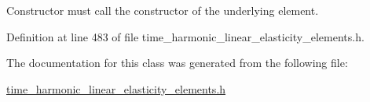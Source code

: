 Constructor must call the constructor of the underlying element. 



Definition at line 483 of file time\+\_\+harmonic\+\_\+linear\+\_\+elasticity\+\_\+elements.\+h.



The documentation for this class was generated from the following file\+:\begin{DoxyCompactItemize}
\item 
\hyperlink{time__harmonic__linear__elasticity__elements_8h}{time\+\_\+harmonic\+\_\+linear\+\_\+elasticity\+\_\+elements.\+h}\end{DoxyCompactItemize}
